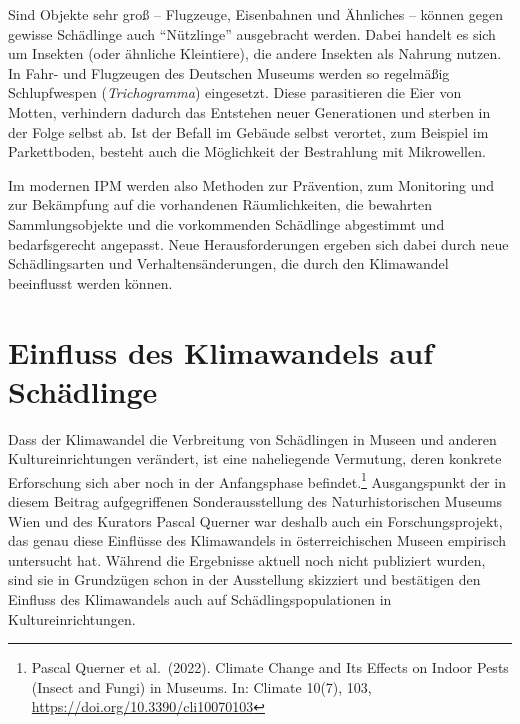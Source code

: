 \documentclass[a4paper,
fontsize=11pt,
oneside,
numbers=noperiodatend,
parskip=half-,
bibliography=totoc,
final
]{scrartcl}
\begin{document}
Sind Objekte sehr groß -- Flugzeuge, Eisenbahnen und Ähnliches -- können
gegen gewisse Schädlinge auch \enquote{Nützlinge} ausgebracht werden.
Dabei handelt es sich um Insekten (oder ähnliche Kleintiere), die andere
Insekten als Nahrung nutzen. In Fahr- und Flugzeugen des Deutschen
Museums werden so regelmäßig Schlupfwespen (\emph{Trichogramma})
eingesetzt. Diese parasitieren die Eier von Motten, verhindern dadurch
das Entstehen neuer Generationen und sterben in der Folge selbst ab. Ist
der Befall im Gebäude selbst verortet, zum Beispiel im Parkettboden,
besteht auch die Möglichkeit der Bestrahlung mit Mikrowellen.

Im modernen IPM werden also Methoden zur Prävention, zum Monitoring und
zur Bekämpfung auf die vorhandenen Räumlichkeiten, die bewahrten
Sammlungsobjekte und die vorkommenden Schädlinge abgestimmt und
bedarfsgerecht angepasst. Neue Herausforderungen ergeben sich dabei
durch neue Schädlingsarten und Verhaltensänderungen, die durch den
Klimawandel beeinflusst werden können.

\section{Einfluss des Klimawandels auf
Schädlinge}\label{einfluss-des-klimawandels-auf-schuxe4dlinge}

Dass der Klimawandel die Verbreitung von Schädlingen in Museen und
anderen Kultureinrichtungen verändert, ist eine naheliegende Vermutung,
deren konkrete Erforschung sich aber noch in der Anfangsphase
befindet.\footnote{Pascal Querner et al.~(2022). Climate Change and Its
  Effects on Indoor Pests (Insect and Fungi) in Museums. In: Climate
  10(7), 103, \url{https://doi.org/10.3390/cli10070103}} Ausgangspunkt
der in diesem Beitrag aufgegriffenen Sonderausstellung des
Naturhistorischen Museums Wien und des Kurators Pascal Querner war
deshalb auch ein Forschungsprojekt, das genau diese Einflüsse des
Klimawandels in österreichischen Museen empirisch untersucht hat.
Während die Ergebnisse aktuell noch nicht publiziert wurden, sind sie in
Grundzügen schon in der Ausstellung skizziert und bestätigen den
Einfluss des Klimawandels auch auf Schädlingspopulationen in
Kultureinrichtungen.
\end{document}
